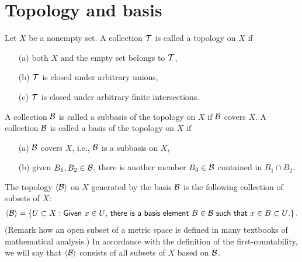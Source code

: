 \section{Topology and basis}

\begin{defi}
    Let $X$ be a nonempty set.
    A collection ${\mathcal{T}}$ is called a topology on $X$ if
    \begin{enumerate}
        \item[(a)]
        {
            both $X$ and the empty set belongs to ${\mathcal{T}}$,
        }
        \item[(b)]
        {
            ${\mathcal{T}}$ is closed under arbitrary unions,
        }
        \item[(c)]
        {
            ${\mathcal{T}}$ is closed under arbitrary finite intersections.
        }
    \end{enumerate}
\end{defi}

\begin{defi}
    A collection ${\mathcal{B}}$ is called a subbasis of the topology on $X$ if ${\mathcal{B}}$ covers $X$.
    A collection ${\mathcal{B}}$ is called a basis of the topology on $X$ if
    \begin{enumerate}
        \item[(a)]
        {
            ${\mathcal{B}}$ covers $X$, i.e., ${\mathcal{B}}$ is a subbasis on $X$,
        }
        \item[(b)]
        {
            given $B_1, B_2\in{\mathcal{B}}$, there is another member $B_3\in{\mathcal{B}}$ contained in $B_1\cap B_2$.
        }
    \end{enumerate}
    The topology $\langle{\mathcal{B}}\rangle$ on $X$ generated by the basis ${\mathcal{B}}$ is the following collection of subsets of $X$:
    \begin{align*}
        {\left\langle{{\mathcal{B}}}\right\rangle}=\left\{
            U\subset X:\textsf{Given $x\in U$, there is a basis element $B\in{\mathcal{B}}$ such that $x\in B\subset U$.}
        \right\}.
    \end{align*}
    (Remark how an open subset of a metric space is defined in many textbooks of mathematical analysis.)
    In accordance with the definition of the first-countability, we will say that ${\left\langle{{\mathcal{B}}}\right\rangle}$ consists of all subsets of $X$ based on ${\mathcal{B}}$.
\end{defi}

